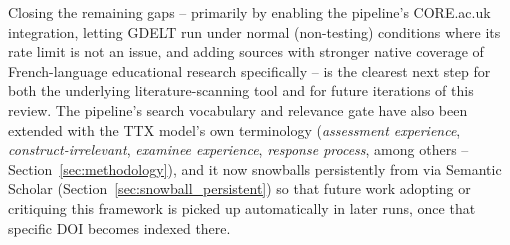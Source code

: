 \documentclass[11pt]{article}
\begin{document}
Closing the remaining gaps -- primarily by enabling the pipeline's CORE.ac.uk integration, letting GDELT run under normal (non-testing) conditions where its rate limit is not an issue, and adding sources with stronger native coverage of French-language educational research specifically -- is the clearest next step for both the underlying literature-scanning tool and for future iterations of this review. The pipeline's search vocabulary and relevance gate have also been extended with the TTX model's own terminology (\textit{assessment experience}, \textit{construct-irrelevant}, \textit{examinee experience}, \textit{response process}, among others -- Section~\ref{sec:methodology}), and it now snowballs persistently from \citet{araneda2023dissertation} via Semantic Scholar (Section~\ref{sec:snowball_persistent}) so that future work adopting or critiquing this framework is picked up automatically in later runs, once that specific DOI becomes indexed there.
\end{document}
